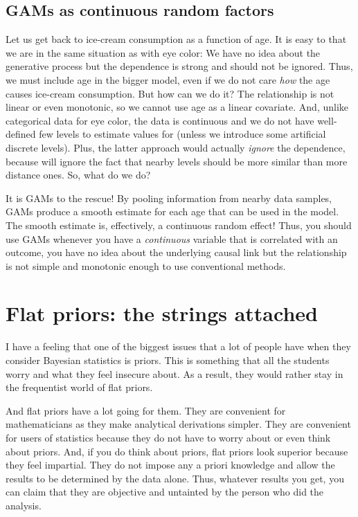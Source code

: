\documentclass[
]{book}
\begin{document}
\hypertarget{gams-as-continuous-random-factors}{%
\section{GAMs as continuous random factors}\label{gams-as-continuous-random-factors}}

Let us get back to ice-cream consumption as a function of age. It is easy to that we are in the same situation as with eye color: We have no idea about the generative process but the dependence is strong and should not be ignored. Thus, we must include age in the bigger model, even if we do not care \emph{how} the age causes ice-cream consumption. But how can we do it? The relationship is not linear or even monotonic, so we cannot use age as a linear covariate. And, unlike categorical data for eye color, the data is continuous and we do not have well-defined few levels to estimate values for (unless we introduce some artificial discrete levels). Plus, the latter approach would actually \emph{ignore} the dependence, because will ignore the fact that nearby levels should be more similar than more distance ones. So, what do we do?

It is GAMs to the rescue! By pooling information from nearby data samples, GAMs produce a smooth estimate for each age that can be used in the model. The smooth estimate is, effectively, a continuous random effect! Thus, you should use GAMs whenever you have a \emph{continuous} variable that is correlated with an outcome, you have no idea about the underlying causal link but the relationship is not simple and monotonic enough to use conventional methods.

\hypertarget{flat-priors-the-strings-attached}{%
\chapter{Flat priors: the strings attached}\label{flat-priors-the-strings-attached}}

I have a feeling that one of the biggest issues that a lot of people have when they consider Bayesian statistics is priors. This is something that all the students worry and what they feel insecure about. As a result, they would rather stay in the frequentist world of flat priors.

And flat priors have a lot going for them. They are convenient for mathematicians as they make analytical derivations simpler. They are convenient for users of statistics because they do not have to worry about or even think about priors. And, if you do think about priors, flat priors look superior because they feel impartial. They do not impose any a priori knowledge and allow the results to be determined by the data alone. Thus, whatever results you get, you can claim that they are objective and untainted by the person who did the analysis.
\end{document}
